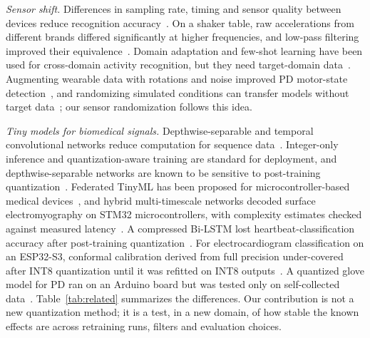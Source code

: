 \documentclass[preprint,12pt]{elsarticle}
\begin{document}
\emph{Sensor shift.} Differences in sampling rate, timing and sensor quality between devices reduce recognition accuracy~\cite{Stisen2015}. On a shaker table, raw accelerations from different brands differed significantly at higher frequencies, and low-pass filtering improved their equivalence~\cite{CoyleAsbil2026}. Domain adaptation and few-shot learning have been used for cross-domain activity recognition, but they need target-domain data~\cite{Zhu2025,Zheng2026}. Augmenting wearable data with rotations and noise improved PD motor-state detection~\cite{Um2017}, and randomizing simulated conditions can transfer models without target data~\cite{Tobin2017}; our sensor randomization follows this idea.

\emph{Tiny models for biomedical signals.} Depthwise-separable and temporal convolutional networks reduce computation for sequence data~\cite{Howard2017,Bai2018}. Integer-only inference and quantization-aware training are standard for deployment, and depthwise-separable networks are known to be sensitive to post-training quantization~\cite{Jacob2018,Krishnamoorthi2018,Nagel2021,NagelDFQ2019}. Federated TinyML has been proposed for microcontroller-based medical devices~\cite{Ibrar2026}, and hybrid multi-timescale networks decoded surface electromyography on STM32 microcontrollers, with complexity estimates checked against measured latency~\cite{Ortone2026}. A compressed Bi-LSTM lost heartbeat-classification accuracy after post-training quantization~\cite{Nikandish2026}. For electrocardiogram classification on an ESP32-S3, conformal calibration derived from full precision under-covered after INT8 quantization until it was refitted on INT8 outputs~\cite{ElAllam2026}. A quantized glove model for PD ran on an Arduino board but was tested only on self-collected data~\cite{Parikh2026}. Table~\ref{tab:related} summarizes the differences. Our contribution is not a new quantization method; it is a test, in a new domain, of how stable the known effects are across retraining runs, filters and evaluation choices.
\end{document}
